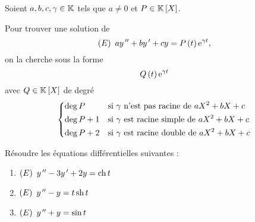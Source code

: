 \begin{meth}
Soient \(a,b,c,\gamma\in\mathbb{K}\) tels que \(a\not=0\) et \(P\in\poly\).

Pour trouver une solution de \[\left(E\right)~ay^{\,\prime\prime}+by^{\,\prime}+cy=P\left(t\right)\mathrm{e}^{\gamma t},\] on la cherche sous la forme \[Q\left(t\right)\mathrm{e}^{\gamma t}\] avec \(Q\in\poly\) de degré \[\begin{dcases}
\deg P &\text{si }\gamma\text{ n'est pas racine de }aX^2+bX+c \\
\deg P+1 &\text{si }\gamma\text{ est racine simple de }aX^2+bX+c \\
\deg P+2 &\text{si }\gamma\text{ est racine double de }aX^2+bX+c \\
\end{dcases}\]
\end{meth}

\begin{exoex}
Résoudre les équations différentielles suivantes :

\begin{enumerate}
\item \(\left(E\right)~y^{\,\prime\prime}-3y^{\,\prime}+2y=\operatorname{ch} t\) \\

\item \(\left(E\right)~y^{\,\prime\prime}-y=t\operatorname{sh} t\) \\

\item \(\left(E\right)~y^{\,\prime\prime}+y=\sin t\)
\end{enumerate}
\end{exoex}

